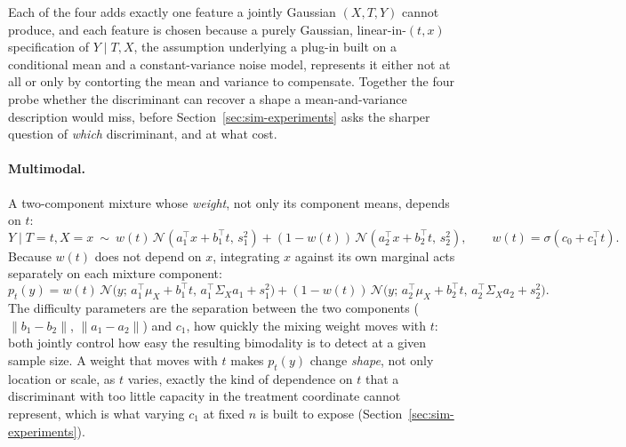 \documentclass[11pt]{article}
\theoremstyle{plain}
\theoremstyle{definition}
\theoremstyle{remark}
\begin{document}
Each of the four adds exactly one feature a jointly Gaussian $(X,T,Y)$ cannot produce, and each
feature is chosen because a purely Gaussian, linear-in-$(t,x)$ specification of $Y\mid T,X$,
the assumption underlying a plug-in built on a conditional mean and a constant-variance noise
model, represents it either not at all or only by contorting the mean and variance to
compensate. Together the four probe whether the discriminant can recover a shape a mean-and-variance
description would miss, before Section~\ref{sec:sim-experiments} asks the sharper question of
\emph{which} discriminant, and at what cost.

\paragraph{Multimodal.} A two-component mixture whose \emph{weight}, not only its component means,
depends on $t$:
\begin{equation}
Y \mid T=t,X=x \ \sim\ w(t)\,\mathcal N(a_1^\top x + b_1^\top t,\, s_1^2)
+ (1-w(t))\,\mathcal N(a_2^\top x + b_2^\top t,\, s_2^2), \qquad
w(t) = \sigma(c_0 + c_1^\top t).
\label{eq:app-dgp-mixture}
\end{equation}
Because $w(t)$ does not depend on $x$, integrating $x$ against its own marginal acts separately on
each mixture component:
\begin{equation}
p_t(y) = w(t)\,\mathcal N\big(y;\, a_1^\top\mu_X + b_1^\top t,\, a_1^\top\Sigma_X a_1 + s_1^2\big)
+ (1-w(t))\,\mathcal N\big(y;\, a_2^\top\mu_X + b_2^\top t,\, a_2^\top\Sigma_X a_2 + s_2^2\big).
\label{eq:app-dgp-mixture-density}
\end{equation}
The difficulty parameters are the separation between the two components ($\|b_1-b_2\|$,
$\|a_1-a_2\|$) and $c_1$, how quickly the mixing weight moves with $t$: both jointly control how
easy the resulting bimodality is to detect at a given sample size. A weight that moves with $t$
makes $p_t(y)$ change \emph{shape}, not only location or scale, as $t$ varies, exactly the kind
of dependence on $t$ that a discriminant with too little capacity in the treatment coordinate
cannot represent, which is what varying $c_1$ at fixed $n$ is built to expose
(Section~\ref{sec:sim-experiments}).
\end{document}
